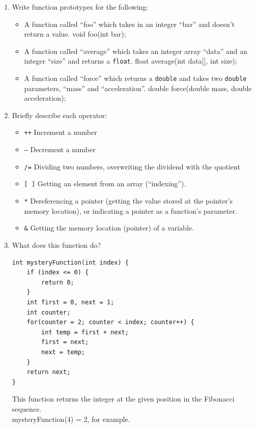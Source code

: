 \documentclass[letter,11pt]{article}
\begin{document}
\begin{enumerate}
    \item Write function prototypes for the following:
    \begin{itemize}
        \item A function called ``foo'' which takes in an integer ``bar'' and doesn't return a value. {\color{red}void foo(int bar);}
        \item A function called ``average'' which takes an integer array ``data'' and an integer ``size'' and returns a \texttt{float}. {\color{red}float average(int data[], int size);}
        \item A function called ``force'' which returns a \texttt{double} and takes two \texttt{double} parameters, ``mass'' and ``acceleration''. {\color{red}double force(double mass, double acceleration);}
    \end{itemize}
    
    \item Briefly describe each operator:
    \begin{itemize}
        \item \texttt{++} {\color{red}Increment a number}
        \item \texttt{--} {\color{red}Decrement a number}
        \item \texttt{/=} {\color{red}Dividing two numbers, overwriting the dividend with the quotient}
        \item \texttt{[ ]} {\color{red}Getting an element from an array (``indexing'').}
        \item \texttt{*} {\color{red}Dereferencing a pointer (getting the value stored at the pointer's memory location), or indicating a pointer as a function's parameter.}
        \item \texttt{\&} {\color{red}Getting the memory location (pointer) of a variable.}
    \end{itemize}
    
    \item What does this function do?
    \begin{verbatim}
int mysteryFunction(int index) {
    if (index <= 0) {
        return 0;
    }
    int first = 0, next = 1;
    int counter;
    for(counter = 2; counter < index; counter++) {
        int temp = first + next;
        first = next;
        next = temp;
    }
    return next;
}
    \end{verbatim} {\color{red}This function returns the integer at the given position in the Fibonacci sequence. \\ mysteryFunction(4) = 2, for example.}
    

\end{enumerate}
\end{document}
